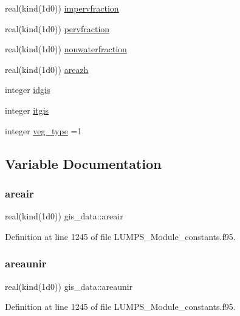 \begin{DoxyCompactItemize}
\item 
real(kind(1d0)) \hyperlink{namespacegis__data_af2e0c2e076d483696937dc3732bd0fc2}{impervfraction}
\item 
real(kind(1d0)) \hyperlink{namespacegis__data_aafb1e051dfaaf0a04760dc14acf4b053}{pervfraction}
\item 
real(kind(1d0)) \hyperlink{namespacegis__data_a33f200820c4bd251ccc75f2cf5ca8f04}{nonwaterfraction}
\item 
real(kind(1d0)) \hyperlink{namespacegis__data_a59a6c27dbdfd939e15369ac064221241}{areazh}
\item 
integer \hyperlink{namespacegis__data_ada1260f672e04bbd0157fc95c2e36b91}{idgis}
\item 
integer \hyperlink{namespacegis__data_aeaf96e2a9b1651309ef3645d9277a439}{itgis}
\item 
integer \hyperlink{namespacegis__data_a9cc38462906e83260e293f5b447c4374}{veg\+\_\+type} =1
\end{DoxyCompactItemize}


\subsection{Variable Documentation}
\mbox{\label{namespacegis__data_ae687756bf9ebbc2a6b62812fa76ab008}} 
\subsubsection{\texorpdfstring{areair}{areair}}
{\footnotesize\ttfamily real(kind(1d0)) gis\+\_\+data\+::areair}



Definition at line 1245 of file L\+U\+M\+P\+S\+\_\+\+Module\+\_\+constants.\+f95.

\mbox{\label{namespacegis__data_aa03da52768d09c13ccfeb0d193f41b2e}} 
\subsubsection{\texorpdfstring{areaunir}{areaunir}}
{\footnotesize\ttfamily real(kind(1d0)) gis\+\_\+data\+::areaunir}



Definition at line 1245 of file L\+U\+M\+P\+S\+\_\+\+Module\+\_\+constants.\+f95.

